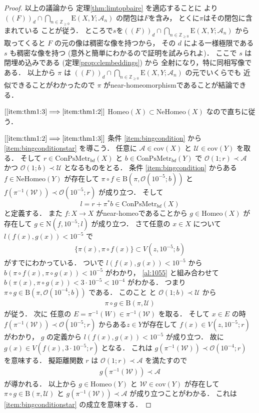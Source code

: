 \documentclass[leqno, a4paper, 12pt]{jsarticle}
\numberwithin{equation}{section}
\newcommand{\To}{\Longrightarrow}
\newcommand{\zz}{\mathbb{Z}}
\newcommand{\yocov}[1]{\mathrm{cov}(#1)}
\newcommand{\yocovfont}[1]{\mathscr{#1}}
\newcommand{\yofine}{\prec}
\newcommand{\yonbset}[2]{\mathrm{B}(#1, #2)}
\newcommand{\yonbsetq}[3]{\mathrm{N}(#1, #2; #3)}
\newcommand{\yocbmet}[1]{\mathrm{ConPsMetr}_{bd}(#1)}
\newcommand{\yoball}[3]{V(#1, #2; #3)}
\newcommand{\yoballfam}[2]{\yocovfont{O}(#1; #2)}
\newcommand{\yocmaps}[3]{\mathrm{E}(#1, #2; #3)}
\newcommand{\yomapnhset}[1]{\mathrm{NeHomeo}(#1)}
\newcommand{\yomaphset}[1]{\mathrm{Homeo}(#1)}
\newcommand{\yometcl}[2]{(\!(#1)\!)_{#2}}
\begin{document}
\begin{proof}
以上の議論から
定理\ref{thm:limtopbaire}
を適応することに
より
$\yometcl{F}{d}\cap \bigcap_{n\in \zz_{\ge 0}}\yocmaps{X}{Y}{\yocovfont{A}_{n}}$
の閉包は$F$を含み，
とくに$\pi$はその閉包に含まれている
ことが従う．
ところで$s$を$\yometcl{F}{d}\cap \bigcap_{n\in \zz_{\ge 0}}\yocmaps{X}{Y}{\yocovfont{A}_{n}}$
から取ってくると
$F$
の元の像は稠密な像を持つから，
その
$d$
による一様極限である
$s$
も稠密な像を持つ
(意外と簡単にわかるので証明を試みられよ)．
ここで
$s$
は閉埋め込みである
(定理\ref{prop:clembeddings})
から
全射になり，特に同相写像である．
以上から
$\pi$
は
$\yometcl{F}{d}\cap \bigcap_{n\in \zz_{\ge 0}}\yocmaps{X}{Y}{\yocovfont{A}_{n}}$
の元でいくらでも
近似できることがわかったので
$\pi$
がnear-homeomorphismであることが結論できる．



$[\ref{item:thm1:3}\To \ref{item:thm1:2}]$
$\yomaphset{X}\subset \yomapnhset{X}$
なので直ちに従う．


$[\ref{item:thm1:2}\To \ref{item:thm1:3}]$
条件
\ref{item:bingcondition}
から
\ref{item:bingconditionstar}
を導こう．
任意に
$\yocovfont{A}\in \yocov{X}$
と
$\yocovfont{U}\in \yocov{Y}$
を取る．
そして 
$r\in \yocbmet{X}$
と
$b\in \yocbmet{Y}$
で
$\yoballfam{1}{r}\yofine \yocovfont{A}$
かつ
$\yoballfam{1}{b}\yofine \yocovfont{U}$
となるものをとる．
条件
\ref{item:bingcondition}
からある
$f\in \yomapnhset{Y}$
が存在して
$\pi\circ f\in \yonbset{\pi}{\yoballfam{10^{-5}}{b}}$
と
$f(\pi^{-1}(\yocovfont{W}))\yofine \yoballfam{10^{-5}}{r}$
が成り立つ．
そして
\[
l=r+\pi^{*}b\in \yocbmet{X}
\]
と定義する．
また
$f\colon X\to X$
がnear-homeoであることから
$g\in \yomaphset{X}$
が存在して
$g\in \yonbsetq{f}{10^{-5}}{l}$
が成り立つ．
さて任意の
$x\in X$
について
$l(f(x), g(x))<10^{-5}$
で
\begin{align}\label{al:1055}
\{\pi(x), \pi\circ f(x)\}\subset \yoball{z}{10^{-5}}{b}
\end{align}
がすでにわかっている．
ついで
$l(f(x), g(x))<10^{-5}$
から
$b(\pi\circ f(x), \pi\circ g(x))<10^{-5}$
がわかり，
\eqref{al:1055}
と組み合わせて
$b(\pi(x), \pi\circ g(x))<3\cdot 10^{-5}<10^{-4}$
がわかる．
つまり
$\pi\circ g\in \yonbset{\pi}{\yoballfam{10^{-4}}{b}}$
である．
このこと
と
$\yoballfam{1}{b}\yofine \yocovfont{U}$
から
\begin{align}
\pi\circ g\in \yonbset{\pi}{\yocovfont{U}}
\end{align}
が従う．
次に
任意の
$E=\pi^{-1}(W)\in \pi^{-1}(\yocovfont{W})$
を取る．
そして
$x\in E$
の時
$f(\pi^{-1}(\yocovfont{W}))\yofine \yoballfam{10^{-5}}{r}$
からある$z\in Y$が存在して
$f(x)\in \yoball{z}{10^{-5}}{r}$がわかり，
$g$
の定義から
$l(f(x), g(x))<10^{-5}$
が成り立つ．
故に
$g(x)\in \yoball{f(x)}{3\cdot 10^{-5}}{r}$
となる．
これは
$g(\pi^{-1}(\yocovfont{W}))\yofine \yoballfam{10^{-4}}{r}$
を意味する．
擬距離関数
$r$
は
$\yoballfam{1}{r}\yofine \yocovfont{A}$
を満たすので
\begin{align}
g(\pi^{-1}(\yocovfont{W}))\yofine \yocovfont{A}
\end{align}
が導かれる．
以上から
$g\in \yomaphset{Y}$
と
$\yocovfont{W}\in \yocov{Y}$
が存在して
$\pi\circ g\in \yonbset{\pi}{\yocovfont{U}}$
と
$g(\pi^{-1}(\yocovfont{W}))\yofine \yocovfont{A}$
が成り立つことがわかる．
これは
\ref{item:bingconditionstar}
の成立を意味する．


\end{proof}
\end{document}
